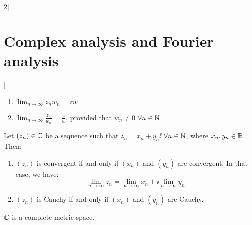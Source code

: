 \documentclass[../../../main.tex]{subfiles}
\begin{document}
\begin{multicols}{2}[\section{Complex analysis and Fourier analysis}]
\begin{proposition}
\begin{enumerate}
      \item $\displaystyle\lim_{n\to\infty}z_nw_n=zw$
      \item $\displaystyle\lim_{n\to\infty}\frac{z_n}{w_n}=\frac{z}{w}$, provided that $w_n\ne 0$ $\forall n\in\mathbb{N}$.
    \end{enumerate}
  \end{proposition}
  \begin{definition}
    Let $(z_n)\in\mathbb{C}$ be a sequence such that $z_n=x_n+y_n\ii$ $\forall n\in\mathbb{N}$, where $x_n,y_n\in\mathbb{R}$. Then:
    \begin{enumerate}
      \item $(z_n)$ is convergent if and only if $(x_n)$ and $(y_n)$ are convergent. In that case, we have: $$\lim_{n\to\infty}z_n=\lim_{n\to\infty}x_n+\ii\lim_{n\to\infty}y_n$$
      \item $(z_n)$ is Cauchy if and only if $(x_n)$ and $(y_n)$ are Cauchy.
    \end{enumerate}
  \end{definition}
  \begin{theorem}
    $\mathbb{C}$ is a complete metric space.
  \end{theorem}

\end{multicols}
\end{document}
